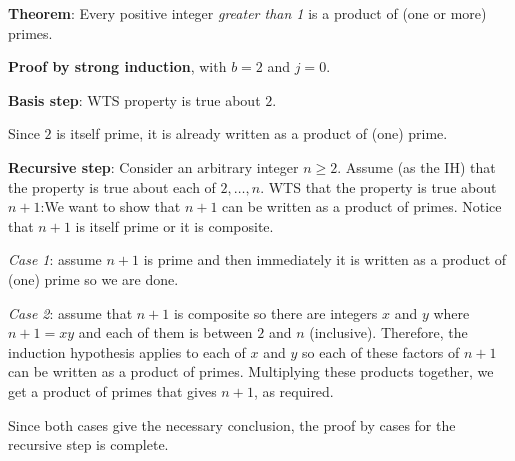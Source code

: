 
{\bf Theorem}: Every positive integer {\it greater than 1} is a product of (one or more) primes.

{\bf Proof by strong induction}, with $b=2$ and $j=0$.

{\bf Basis step}:  WTS property is true about  $2$.

Since $2$ is itself prime,
it is already written as a product of (one) prime.


{\bf Recursive step}: Consider an arbitrary integer $n \geq 2$.
Assume (as the IH) that the property is true about  each of $2, \ldots, n$.  
WTS that the property is true about  $n+1$:We want to show that $n+1$ can be written 
as a product of primes.  Notice that $n+1$ is itself prime or it is composite.

{\it Case 1}: assume $n+1$ is prime and then immediately it is written as a product
of (one) prime so we are done.  

{\it Case 2}: assume that $n+1$ is composite
so there are integers $x$ and $y$ where $n+1 = xy$ and each of them is between $2$ and $n$
(inclusive).  Therefore, the induction hypothesis applies to each of $x$ and $y$ so each 
of these factors of $n+1$ can be written as a product of primes.  Multiplying these products together, 
we get a product of primes that gives $n+1$, as required. 

Since both cases give the necessary
conclusion, the proof by cases for the recursive step is complete.